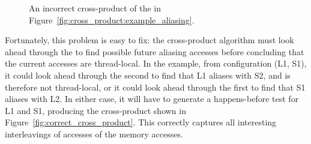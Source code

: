 \begin{figure}
  \caption{An incorrect cross-product of the {\StateMachines} in
    Figure~\ref{fig:cross_product:example_aliasing}.  }
  \label{fig:incorrect_cross_product}
\end{figure}

Fortunately, this problem is easy to fix: the cross-product algorithm
must look ahead through the {\StateMachines} to find possible future
aliasing accesses before concluding that the current accesses are
thread-local.  In the example, from configuration (L1, S1), it could
look ahead through the second {\StateMachine} to find that L1 aliases
with S2, and is therefore not thread-local, or it could look ahead
through the first {\StateMachine} to find that S1 aliases with L2.  In
either case, it will have to generate a happens-before test for L1 and
S1, producing the cross-product {\StateMachine} shown in
Figure~\ref{fig:correct_cross_product}.  This {\StateMachine}
correctly captures all interesting interleavings of accesses of the
memory accesses.

